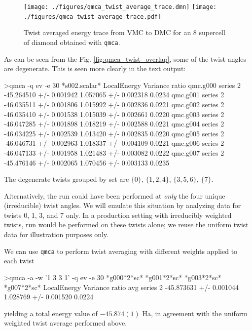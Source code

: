 \begin{figure}
\begin{center}
\ifdefined\HCode
\texttt{[image: ./figures/qmca\_twist\_average\_trace.dmn]}
\else
\texttt{[image: ./figures/qmca\_twist\_average\_trace.pdf]}
\fi
\end{center}
\caption{Twist averaged energy trace from VMC to DMC for an 8 supercell of diamond obtained with \texttt{qmca}.}
\label{fig:qmca_twist_average}
\end{figure}

As can be seen from the Fig. \ref{fig:qmca_twist_overlap}, some of the twist 
angles are degenerate. This is seen more clearly in the text output:
\begin{shade}
>qmca -q ev -e 30 *s002.scalar*
                            LocalEnergy               Variance           ratio 
qmc.g000  series 2  -45.264510 +/- 0.001942   1.057065 +/- 0.002318   0.0234 
qmc.g001  series 2  -46.035511 +/- 0.001806   1.015992 +/- 0.002836   0.0221 
qmc.g002  series 2  -46.035410 +/- 0.001538   1.015039 +/- 0.002661   0.0220 
qmc.g003  series 2  -46.047285 +/- 0.001898   1.018219 +/- 0.002588   0.0221 
qmc.g004  series 2  -46.034225 +/- 0.002539   1.013420 +/- 0.002835   0.0220 
qmc.g005  series 2  -46.046731 +/- 0.002963   1.018337 +/- 0.004109   0.0221 
qmc.g006  series 2  -46.047133 +/- 0.001958   1.021483 +/- 0.003082   0.0222 
qmc.g007  series 2  -45.476146 +/- 0.002065   1.070456 +/- 0.003133   0.0235 
\end{shade}
\noindent
The degenerate twists grouped by set are $\{0\}$, $\{1,2,4\}$, $\{3,5,6\}$, 
$\{7\}$.

Alternatively, the run could have been performed at \emph{only} the four 
unique (irreducible) twist angles.  We will emulate this situation by 
analyzing data for twists 0, 1, 3, and 7 only.  In a production setting 
with irreducibly weighted twists, run would be performed on these twists 
alone; we reuse the uniform twist data for illustration purposes only.  

We can use \texttt{qmca} to perform twist averaging with different 
weights applied to each twist
\begin{shade}
>qmca -a -w '1 3 3 1' -q ev -e 30 *g000*2*sc* *g001*2*sc* *g003*2*sc* *g007*2*sc*
                            LocalEnergy               Variance           ratio 
avg  series 2  -45.873631 +/- 0.001044   1.028769 +/- 0.001520   0.0224 
\end{shade}
\noindent
yielding a total energy value of $-45.874(1)$ Ha, in agreement with the 
uniform weighted twist average performed above.  

